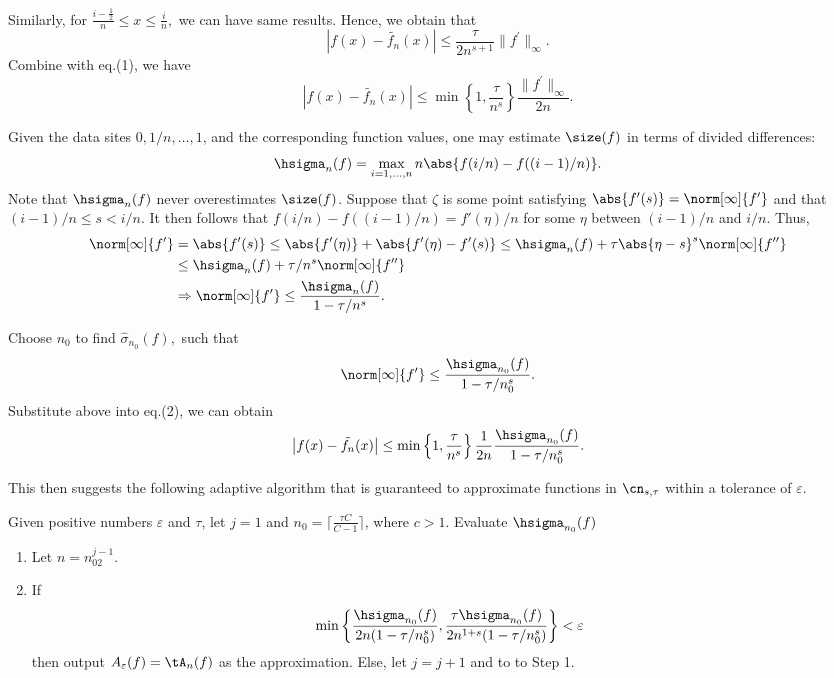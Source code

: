 Similarly, for $\frac{i-\frac{1}{2}}{n} \leq x \leq \frac{i}{n},$ we can have same results.
Hence, we obtain that
$$\left|f(x)-\tilde{f_{n}}(x)\right|\leq\frac{\tau}{2n^{s+1}}\|f^{'}\|_{\infty}.$$
Combine with eq.(1), we have
\begin{equation}\left|f(x)-\tilde{f_{n}}(x)\right|\leq\min\left\{1, \frac{\tau}{n^{s}}\right\}\frac{\|f^{'}\|_{\infty}}{2n}.\end{equation}

 Given the data sites $0, 1/n, \dots, 1$, and the corresponding function values, one may estimate $\size(f)$ in terms of divided differences:
\begin{equation}
\hsigma_n(f)= \max_{i=1, \ldots, n} n\abs{f(i/n)-f((i-1)/n)}.
\end{equation}
Note that $\hsigma_n(f)$ never overestimates $\size(f)$. Suppose that $\zeta$ is some point satisfying $\abs{f'(s)} = \norm[\infty]{f'}$ and that $(i-1)/n \le s < i/n$.  It then follows that $f(i/n)-f((i-1)/n) = f'(\eta)/n$ for some $\eta$ between $(i-1)/n$ and $i/n$.  Thus,
\begin{align*}
\norm[\infty]{f'} &= \abs{f'(s)}\leq \abs{f'(\eta)} + \abs{f'(\eta)-f'(s) }  \le \hsigma_n(f) + \tau\abs{ \eta-s}^{s} \norm[\infty]{f''}\nonumber\\
& \leq  \hsigma_n(f) + \tau/n^{s} \norm[\infty]{f''}\nonumber\\
&\Rightarrow \norm[\infty]{f'}  \le \frac{\hsigma_n(f)}{1 - \tau/n^{s}}.
\end{align*}

Choose $n_{0}$ to find $\hat{\sigma}_{n_{0}}(f),$ such that
$$\norm[\infty]{f'}\le \frac{\hsigma_{n_{0}}(f)}{1 - \tau/n_{0}^{s}}.$$
Substitute above into eq.(2), we can obtain
$$\left|f(x)-\tilde{f_{n}}(x)\right|\leq\min\left\{1, \frac{\tau}{n^{s}}\right\}\frac{1}{2n} \frac{\hsigma_{n_{0}}(f)}{1 - \tau/n_{0}^{s}}.
$$

This then suggests the following adaptive algorithm that is guaranteed to approximate functions in $\cn_{s,\tau}$ within a tolerance of $\varepsilon$.

\begin{algo} \label{adapappxalgo} Given positive numbers $\varepsilon$ and $\tau$, let $j=1$ and $n_0=\lceil \frac{\tau C}{C-1} \rceil $, where $c>1.$ Evaluate $\hsigma_{n_{0}}(f)$
\begin{enumerate}
\renewcommand{\labelenumi}{Step \arabic{enumi}.}
\item Let $n=n_02^{j-1}$.
\item If
\[
\min\left\{ \frac{\hsigma_{n_{0}}(f)}{2n(1 - \tau/n_{0}^{s})} , \frac{\tau\hsigma_{n_{0}}(f)}{2n^{1+s}(1 - \tau/n_{0}^{s})} \right\}< \varepsilon
\]
then output $A_{\varepsilon}(f) = \tA_{n}(f)$ as the approximation.  Else, let $j=j+1$ and to to Step 1.
\end{enumerate}
\end{algo}

